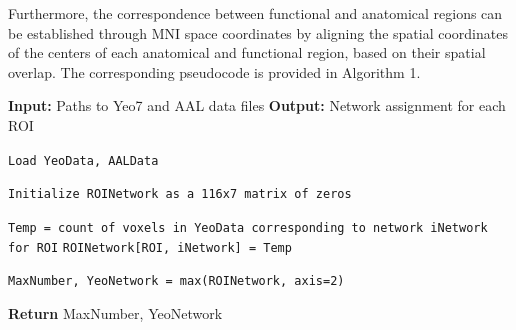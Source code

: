 \documentclass[12pt,technote,onecolumn]{IEEEtran}
\begin{document}
Furthermore, the correspondence between functional and anatomical regions can be established through MNI space coordinates by aligning the spatial coordinates of the centers of each anatomical and functional region, based on their spatial overlap. The corresponding pseudocode is provided in Algorithm 1.

\begin{algorithm}
\caption{Mapping ROIs to Yeo7 Networks}
\begin{algorithmic}[1]
\State \textbf{Input:} Paths to Yeo7 and AAL data files
\State \textbf{Output:} Network assignment for each ROI

\State \texttt{Load YeoData, AALData}

\State \texttt{Initialize ROINetwork as a 116x7 matrix of zeros}

        \State \texttt{Temp = count of voxels in YeoData corresponding to network iNetwork for ROI}
        \State \texttt{ROINetwork[ROI, iNetwork] = Temp}
    \EndFor
\EndFor

\State \texttt{MaxNumber, YeoNetwork = max(ROINetwork, axis=2)}

\State \textbf{Return} MaxNumber, YeoNetwork
\end{algorithmic}
\end{algorithm}
\end{document}
